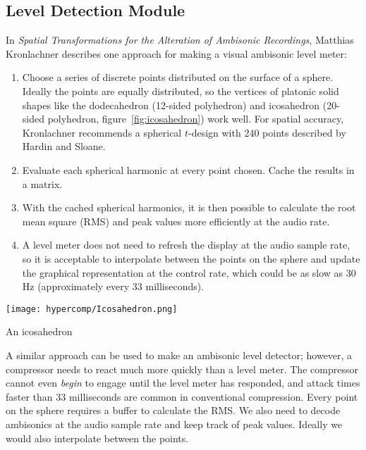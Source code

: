 \subsection{Level Detection Module}
\label{sec:an-accurate-level}
In \textit{Spatial Transformations for the Alteration of Ambisonic
  Recordings}, Matthias Kronlachner describes
one approach for making a visual ambisonic level meter:\cite{Kronlachner2014} 
\begin{enumerate}
\item Choose a series of discrete points distributed on the surface of
  a sphere. Ideally the points are equally distributed, so the
  vertices of platonic solid shapes like the dodecahedron (12-sided
  polyhedron) and icosahedron (20-sided polyhedron,
  figure~\ref{fig:icosahedron}) work well. For spatial accuracy,
  Kronlachner recommends a spherical $t$-design with 240 points
  described by Hardin and Sloane.\cite{Hardin1996}
\item Evaluate each spherical harmonic at every point chosen. Cache
  the results in a matrix. 
\item With the cached spherical harmonics, it is then possible to
  calculate the root mean square (RMS) and peak values more efficiently at the audio
  rate.
\item A level meter does not need to refresh the display at the audio
  sample rate, so it is acceptable to interpolate between the points
  on the sphere and update the graphical representation at the
  control rate, which could be as slow as 30 Hz (approximately every
  33 milliseconds).
\end{enumerate}
\begin{marginfigure}
  \texttt{[image: hypercomp/Icosahedron.png]}
  \caption{An icosahedron}
  \label{fig:icosahedron}
\end{marginfigure}
A similar approach can be used to make an ambisonic level
detector; however, a compressor needs to react much more quickly than a
level meter. The compressor cannot even \emph{begin} to engage until
the level meter has responded, and attack times faster than 33
milliseconds are common in conventional compression. Every point on
the sphere requires a buffer to calculate the RMS. We also need to
decode ambisonics at the audio sample rate and keep track of peak
values. Ideally we would also interpolate between the points.

